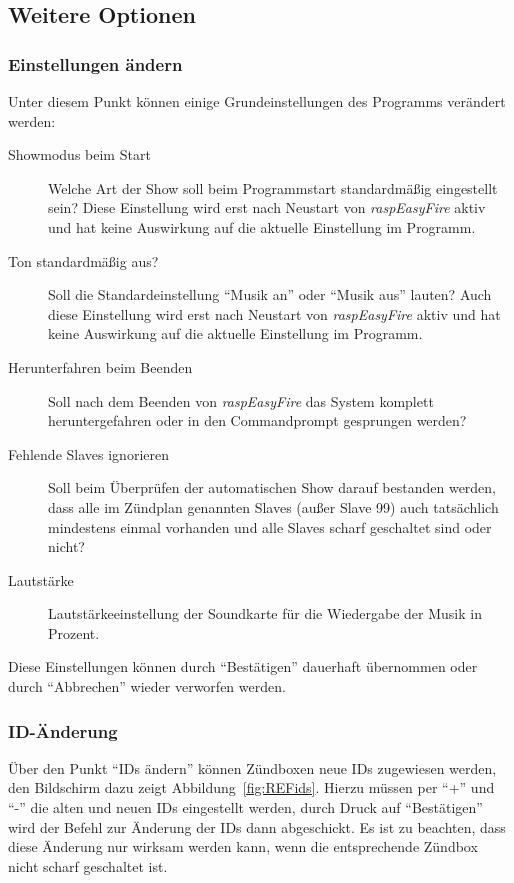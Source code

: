\documentclass[paper=a4, parskip, numbers=noenddot, toc=listof, headsepline]{scrbook}
\newcommand{\REF}{\emph{raspEasyFire}}
\begin{document}
			\subsection{Weitere Optionen}
				\subsubsection{Einstellungen ändern}
					Unter diesem Punkt können einige Grundeinstellungen des Programms verändert werden:
					\begin{description}
						\item [Showmodus beim Start]
						      Welche Art der Show soll beim Programmstart standardmäßig eingestellt sein? Diese Einstellung wird erst nach Neustart von {\REF} aktiv und hat keine Auswirkung auf die aktuelle Einstellung im Programm.
						\item [Ton standardmäßig aus?]
						      Soll die Standardeinstellung \enquote{Musik an} oder \enquote{Musik aus} lauten? Auch diese Einstellung wird erst nach Neustart von {\REF} aktiv und hat keine Auswirkung auf die aktuelle Einstellung im Programm.
						\item [Herunterfahren beim Beenden]
						      Soll nach dem Beenden von {\REF} das System komplett heruntergefahren oder in den Commandprompt gesprungen werden?
						\item [Fehlende Slaves ignorieren]
						      Soll beim Überprüfen der automatischen Show darauf bestanden werden, dass alle im Zündplan genannten Slaves (außer Slave 99) auch tatsächlich mindestens einmal vorhanden und alle Slaves scharf geschaltet sind oder nicht?
						\item [Lautstärke]
						      Lautstärkeeinstellung der Soundkarte für die Wiedergabe der Musik in Prozent.
					\end{description}

					Diese Einstellungen können durch \enquote{Bestätigen} dauerhaft übernommen oder durch \enquote{Abbrechen} wieder verworfen werden.

				\subsubsection{ID-Änderung}

					Über den Punkt \enquote{IDs ändern} können Zündboxen neue IDs zugewiesen werden, den Bildschirm dazu zeigt Abbildung~\ref{fig:REFids}. Hierzu müssen per \enquote{+} und \enquote{-} die alten und neuen IDs eingestellt werden, durch Druck auf \enquote{Bestätigen} wird der Befehl zur Änderung der IDs dann abgeschickt. Es ist zu beachten, dass diese Änderung nur wirksam werden kann, wenn die entsprechende Zündbox nicht scharf geschaltet ist.
\end{document}
